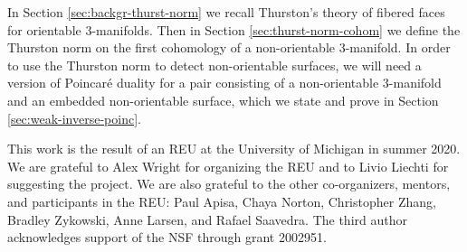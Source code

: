 In Section \ref{sec:backgr-thurst-norm} we recall Thurston's theory of fibered faces for orientable 3-manifolds. Then in Section \ref{sec:thurst-norm-cohom} we define the Thurston norm on the first cohomology of a non-orientable 3-manifold.  In order to use the Thurston norm to detect non-orientable surfaces, we will need a version of Poincar\'e duality for a pair consisting of a non-orientable 3-manifold and an embedded non-orientable surface, which we state and prove in Section \ref{sec:weak-inverse-poinc}.

This work is the result of an REU at the University of Michigan in summer 2020.  We are grateful to Alex Wright for organizing the REU and to Livio Liechti for suggesting the project.  We are also grateful to the other co-organizers, mentors, and participants in the REU: Paul Apisa, Chaya Norton, Christopher Zhang, Bradley Zykowski, Anne Larsen, and Rafael Saavedra.  The third author acknowledges support of the NSF through grant 2002951.



